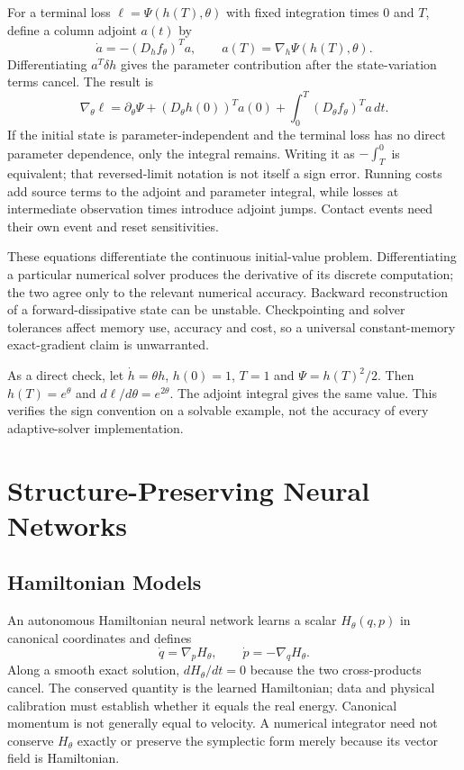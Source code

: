 For a terminal loss $\ell=\Psi(h(T),\theta)$ with fixed integration times $0$ and $T$, define a column adjoint $a(t)$ by
\begin{equation}
\dot a=-(D_hf_\theta)^Ta,\qquad
a(T)=\nabla_h\Psi(h(T),\theta).
\end{equation}
Differentiating $a^T\delta h$ gives the parameter contribution after the state-variation terms cancel. The result is
\begin{equation}
\nabla_\theta\ell=\partial_\theta\Psi
+(D_\theta h(0))^Ta(0)
+\int_0^T(D_\theta f_\theta)^Ta\,dt.
\end{equation}
If the initial state is parameter-independent and the terminal loss has no direct parameter dependence, only the integral remains. Writing it as $-\int_T^0$ is equivalent; that reversed-limit notation is not itself a sign error. Running costs add source terms to the adjoint and parameter integral, while losses at intermediate observation times introduce adjoint jumps. Contact events need their own event and reset sensitivities.

These equations differentiate the continuous initial-value problem. Differentiating a particular numerical solver produces the derivative of its discrete computation; the two agree only to the relevant numerical accuracy. Backward reconstruction of a forward-dissipative state can be unstable. Checkpointing and solver tolerances affect memory use, accuracy and cost, so a universal constant-memory exact-gradient claim is unwarranted.

As a direct check, let $\dot h=\theta h$, $h(0)=1$, $T=1$ and $\Psi=h(T)^2/2$. Then $h(T)=e^\theta$ and $d\ell/d\theta=e^{2\theta}$. The adjoint integral gives the same value. This verifies the sign convention on a solvable example, not the accuracy of every adaptive-solver implementation.

\section{Structure-Preserving Neural Networks}
\label{sec:structure_preserving_nn}

\subsection{Hamiltonian Models}

An autonomous Hamiltonian neural network learns a scalar $H_\theta(q,p)$ in canonical coordinates and defines
\begin{equation}
\dot q=\nabla_pH_\theta,\qquad \dot p=-\nabla_qH_\theta.
\label{eq:hnn_dynamics}
\end{equation}
Along a smooth exact solution, $dH_\theta/dt=0$ because the two cross-products cancel. The conserved quantity is the learned Hamiltonian; data and physical calibration must establish whether it equals the real energy. Canonical momentum is not generally equal to velocity. A numerical integrator need not conserve $H_\theta$ exactly or preserve the symplectic form merely because its vector field is Hamiltonian.

